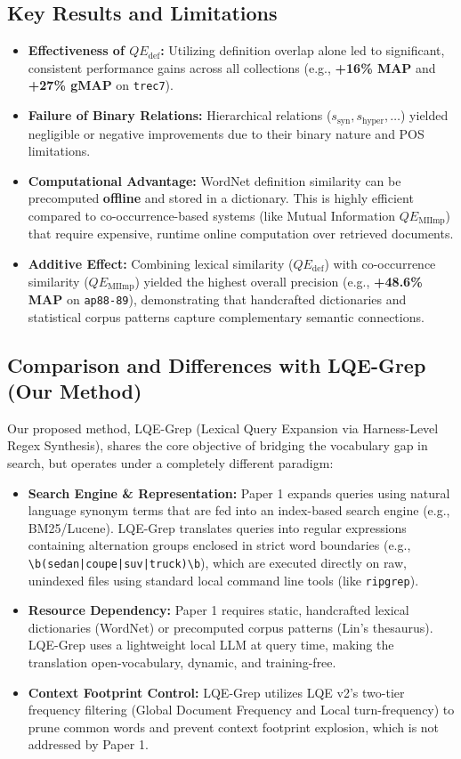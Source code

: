 \documentclass[11pt,a4paper]{article}
\begin{document}
\subsection{Key Results and Limitations}
\begin{itemize}
    \item \textbf{Effectiveness of $QE_{\text{def}}$:} Utilizing definition overlap alone led to significant, consistent performance gains across all collections (e.g., \textbf{+16\% MAP} and \textbf{+27\% gMAP} on \texttt{trec7}).
    \item \textbf{Failure of Binary Relations:} Hierarchical relations ($s_{\text{syn}}, s_{\text{hyper}}, \dots$) yielded negligible or negative improvements due to their binary nature and POS limitations.
    \item \textbf{Computational Advantage:} WordNet definition similarity can be precomputed \textbf{offline} and stored in a dictionary. This is highly efficient compared to co-occurrence-based systems (like Mutual Information $QE_{\text{MIImp}}$) that require expensive, runtime online computation over retrieved documents.
    \item \textbf{Additive Effect:} Combining lexical similarity ($QE_{\text{def}}$) with co-occurrence similarity ($QE_{\text{MIImp}}$) yielded the highest overall precision (e.g., \textbf{+48.6\% MAP} on \texttt{ap88-89}), demonstrating that handcrafted dictionaries and statistical corpus patterns capture complementary semantic connections.
\end{itemize}

\subsection{Comparison and Differences with LQE-Grep (Our Method)}
Our proposed method, LQE-Grep (Lexical Query Expansion via Harness-Level Regex Synthesis), shares the core objective of bridging the vocabulary gap in search, but operates under a completely different paradigm:
\begin{itemize}
    \item \textbf{Search Engine & Representation:} Paper 1 expands queries using natural language synonym terms that are fed into an index-based search engine (e.g., BM25/Lucene). LQE-Grep translates queries into regular expressions containing alternation groups enclosed in strict word boundaries (e.g., \texttt{\textbackslash b(sedan|coupe|suv|truck)\textbackslash b}), which are executed directly on raw, unindexed files using standard local command line tools (like \texttt{ripgrep}).
    \item \textbf{Resource Dependency:} Paper 1 requires static, handcrafted lexical dictionaries (WordNet) or precomputed corpus patterns (Lin's thesaurus). LQE-Grep uses a lightweight local LLM at query time, making the translation open-vocabulary, dynamic, and training-free.
    \item \textbf{Context Footprint Control:} LQE-Grep utilizes LQE v2's two-tier frequency filtering (Global Document Frequency and Local turn-frequency) to prune common words and prevent context footprint explosion, which is not addressed by Paper 1.
\end{itemize}
\end{document}
